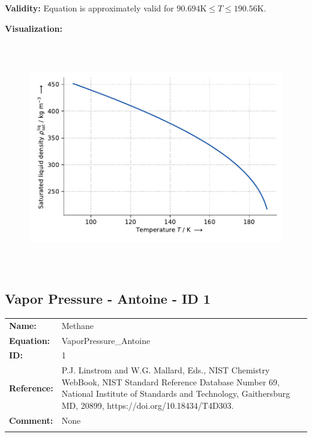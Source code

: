 \textbf{Validity:}
\newline
Equation is approximately valid for $90.694 \si{\kelvin} \leq T \leq 190.56 \si{\kelvin}$.
\newline

\textbf{Visualization:}
%
\begin{figure}[!htp]
{\noindent\includegraphics[height=10cm, keepaspectratio]{figs/ref/ref_Methane_SaturatedLiquidDensity_EoS1_2.pdf}}
\end{figure}
%

\FloatBarrier
\newpage
\subsection{Vapor Pressure - Antoine - ID 1}
%
\begin{tabular}[l]{|lp{11.5cm}|}
\hline
\addlinespace

\textbf{Name:} & Methane \\
\textbf{Equation:} & VaporPressure\_Antoine \\
\textbf{ID:} & 1 \\
\textbf{Reference:} & P.J. Linstrom and W.G. Mallard, Eds., NIST Chemistry WebBook, NIST Standard Reference Database Number 69, National Institute of Standards and Technology, Gaithersburg MD, 20899, https://doi.org/10.18434/T4D303. \\
\textbf{Comment:} & None \\

\addlinespace
\hline
\end{tabular}
\newline

